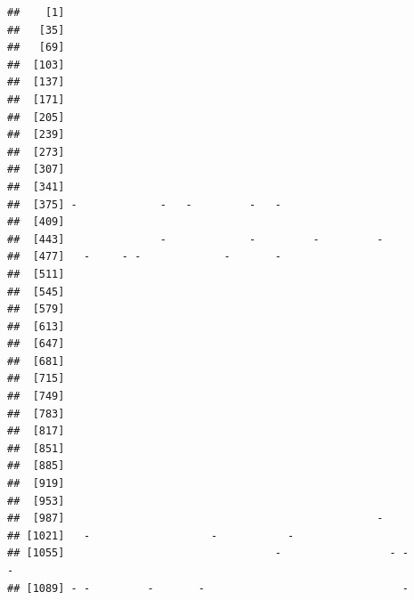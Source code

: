 \documentclass[]{article}
\begin{document}
\begin{verbatim}
##    [1]                                                                    
##   [35]                                                                    
##   [69]                                                                    
##  [103]                                                                    
##  [137]                                                                    
##  [171]                                                                    
##  [205]                                                                    
##  [239]                                                                    
##  [273]                                                                    
##  [307]                                                                    
##  [341]                                                                    
##  [375] -             -   -         -   -                                  
##  [409]                                                                    
##  [443]               -             -         -         -                  
##  [477]   -     - -             -       -                                  
##  [511]                                                                    
##  [545]                                                                    
##  [579]                                                                    
##  [613]                                                                    
##  [647]                                                                    
##  [681]                                                                    
##  [715]                                                                    
##  [749]                                                                    
##  [783]                                                                    
##  [817]                                                                    
##  [851]                                                                    
##  [885]                                                                    
##  [919]                                                                    
##  [953]                                                                    
##  [987]                                                 -                  
## [1021]   -                   -           -                                
## [1055]                                 -                 - -           -  
## [1089] - -         -       -                               -              

\end{verbatim}
\end{document}

